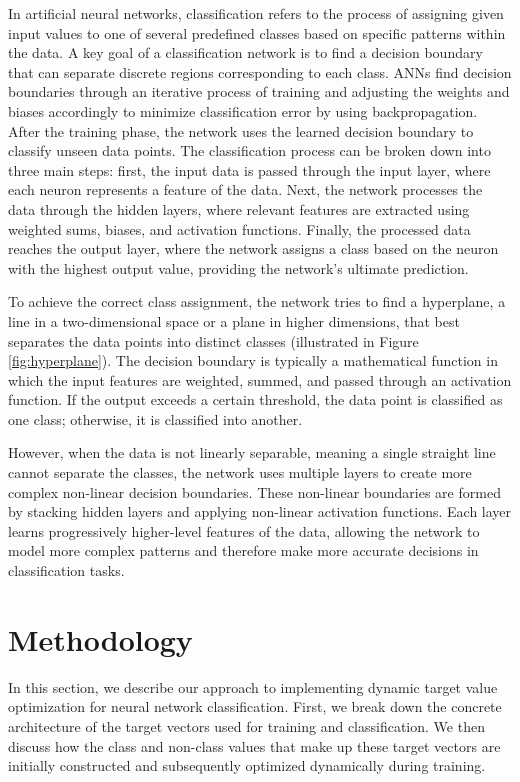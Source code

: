 \documentclass[12pt,fleqn,a4paper]{article}
\begin{document}
In artificial neural networks, classification refers to the process of assigning given input values to one of several predefined classes based on specific patterns within the data. A key goal of a classification network is to find a decision boundary that can separate discrete regions corresponding to each class. ANNs find decision boundaries through an iterative process of training and adjusting the weights and biases accordingly to minimize classification error by using backpropagation. After the training phase, the network uses the learned decision boundary to classify unseen data points. The classification process can be broken down into three main steps: first, the input data is passed through the input layer, where each neuron represents a feature of the data. Next, the network processes the data through the hidden layers, where relevant features are extracted using weighted sums, biases, and activation functions. Finally, the processed data reaches the output layer, where the network assigns a class based on the neuron with the highest output value, providing the network's ultimate prediction.

To achieve the correct class assignment, the network tries to find a hyperplane, a line in a two-dimensional space or a plane in higher dimensions, that best separates the data points into distinct classes (illustrated in Figure \ref{fig:hyperplane}). The decision boundary is typically a mathematical function in which the input features are weighted, summed, and passed through an activation function. If the output exceeds a certain threshold, the data point is classified as one class; otherwise, it is classified into another.

However, when the data is not linearly separable, meaning a single straight line cannot separate the classes, the network uses multiple layers to create more complex non-linear decision boundaries. These non-linear boundaries are formed by stacking hidden layers and applying non-linear activation functions. Each layer learns progressively higher-level features of the data, allowing the network to model more complex patterns and therefore make more accurate decisions in classification tasks.

\section{Methodology}
In this section, we describe our approach to implementing dynamic target value optimization for neural network classification. First, we break down the concrete architecture of the target vectors used for training and classification. We then discuss how the class and non-class values that make up these target vectors are initially constructed and subsequently optimized dynamically during training.
\end{document}
